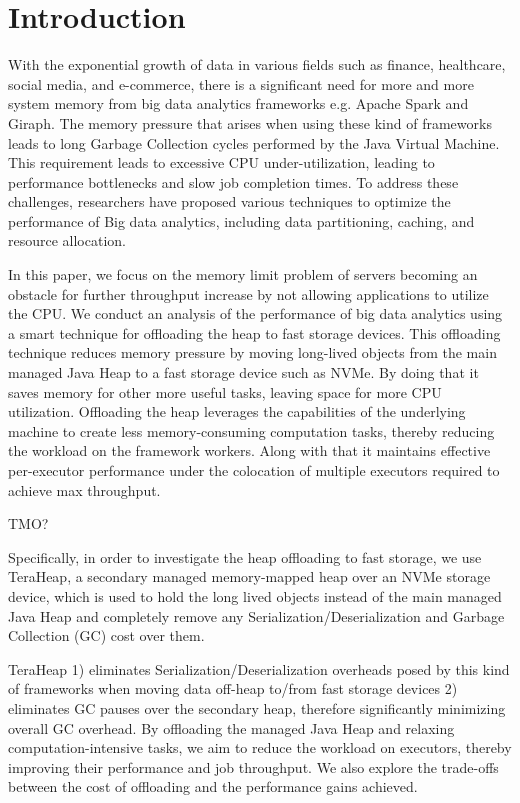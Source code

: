 \section{Introduction}
\label{sec:intro}

With the exponential growth of data in various fields such as finance,
healthcare, social media, and e-commerce, there is a significant need
for more and more system memory from big data analytics frameworks e.g.
Apache Spark \cite{Spark} and Giraph. 
The memory pressure that arises when using these kind of frameworks leads to
long Garbage Collection cycles performed by the Java Virtual Machine.
This requirement leads to excessive CPU under-utilization, 
leading to performance bottlenecks and slow job completion
times. To address these challenges, researchers have proposed various
techniques to optimize the performance of Big data analytics, including
data partitioning, caching, and resource allocation.

In this paper, we focus on the memory limit problem of servers
becoming an obstacle for further throughput increase by not
allowing applications to utilize the CPU. We conduct an
analysis of the performance of big data analytics using a smart
technique for offloading the heap to fast storage devices.
This offloading technique reduces memory pressure by
moving long-lived objects from the main managed Java
Heap to a fast storage device such as NVMe. By doing that it saves memory for
other more useful tasks, leaving space for more CPU utilization.
Offloading the heap leverages the capabilities of the underlying machine to
create less memory-consuming computation tasks, thereby reducing the
workload on the framework workers. Along with that it maintains effective
per-executor performance under the colocation of multiple executors
required to achieve max throughput.

TMO?

Specifically, in order to investigate the heap offloading to fast storage,
we use TeraHeap, a secondary managed
memory-mapped heap over an NVMe storage device, which is used to hold
the long lived objects instead of the main
managed Java Heap and completely remove any
Serialization/Deserialization and Garbage Collection (GC) cost over
them.

TeraHeap 1) eliminates Serialization/Deserialization overheads posed
by this kind of frameworks when moving data off-heap to/from fast
storage devices 2) eliminates GC pauses over the secondary heap,
therefore significantly minimizing overall GC overhead. By offloading
the managed Java Heap and relaxing computation-intensive tasks, we aim
to reduce the workload on executors, thereby improving their
performance and job throughput. We also explore the trade-offs between
the cost of offloading and the performance gains achieved.

